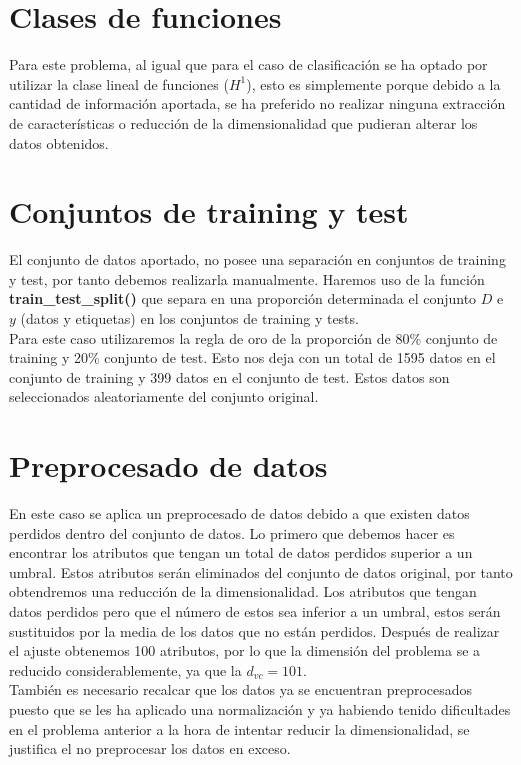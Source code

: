 \section{Clases de funciones}
Para este problema, al igual que para el caso de clasificación se ha optado por utilizar la clase lineal de funciones ($H^{1}$), esto es simplemente porque debido a la cantidad de información aportada, se ha preferido no realizar ninguna extracción de características o reducción de la dimensionalidad que pudieran alterar los datos obtenidos.

\section{Conjuntos de training y test}
El conjunto de datos aportado, no posee una separación en conjuntos de training y test, por tanto debemos realizarla manualmente. Haremos uso de la función \textbf{train\_test\_split()}\cite{Split} que separa en una proporción determinada el conjunto $D$ e $y$ (datos y etiquetas) en los conjuntos de training y tests.\\
Para este caso utilizaremos la regla de oro de la proporción de 80\% conjunto de training y 20\% conjunto de test. Esto nos deja con un total de 1595 datos en el conjunto de training y 399 datos en el conjunto de test. Estos datos son seleccionados aleatoriamente del conjunto original.

\section{Preprocesado de datos}
En este caso se aplica un preprocesado de datos debido a que existen datos perdidos dentro del conjunto de datos. Lo primero que debemos hacer es encontrar los atributos que tengan un total de datos perdidos superior a un umbral. Estos atributos serán eliminados del conjunto de datos original, por tanto obtendremos una reducción de la dimensionalidad. Los atributos que tengan datos perdidos pero que el número de estos sea inferior a un umbral, estos serán sustituidos por la media de los datos que no están perdidos. Después de realizar el ajuste obtenemos 100 atributos, por lo que la dimensión del problema se a reducido considerablemente, ya que la $d_{vc} = 101$.\\
También es necesario recalcar que los datos ya se encuentran preprocesados puesto que se les ha aplicado una normalización y ya habiendo tenido dificultades en el problema anterior a la hora de intentar reducir la dimensionalidad, se justifica el no preprocesar los datos en exceso.

